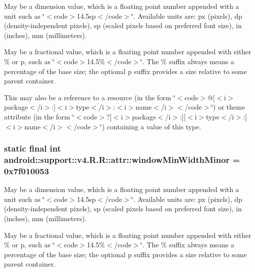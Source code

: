 May be a dimension value, which is a floating point number appended with a unit such as \char`\"{}$<$code$>$14.5sp$<$/code$>$\char`\"{}. Available units are: px (pixels), dp (density-independent pixels), sp (scaled pixels based on preferred font size), in (inches), mm (millimeters). 

May be a fractional value, which is a floating point number appended with either \% or p, such as \char`\"{}$<$code$>$14.5\%$<$/code$>$\char`\"{}. The \% suffix always means a percentage of the base size; the optional p suffix provides a size relative to some parent container. 

This may also be a reference to a resource (in the form \char`\"{}$<$code$>$@\mbox{[}$<$i$>$package$<$/i$>$:\mbox{]}$<$i$>$type$<$/i$>$:$<$i$>$name$<$/i$>$$<$/code$>$\char`\"{}) or theme attribute (in the form \char`\"{}$<$code$>$?\mbox{[}$<$i$>$package$<$/i$>$:\mbox{]}\mbox{[}$<$i$>$type$<$/i$>$:\mbox{]}$<$i$>$name$<$/i$>$$<$/code$>$\char`\"{}) containing a value of this type. \hypertarget{classandroid_1_1support_1_1v4_1_1_r_1_1attr_9fd4e34aa7a7b94a60e07ee5f9f4836a}{
\subsubsection[{windowMinWidthMinor}]{\setlength{\rightskip}{0pt plus 5cm}static final int android::support::v4.R.R::attr::windowMinWidthMinor = 0x7f010053}}
\label{classandroid_1_1support_1_1v4_1_1_r_1_1attr_9fd4e34aa7a7b94a60e07ee5f9f4836a}


May be a dimension value, which is a floating point number appended with a unit such as \char`\"{}$<$code$>$14.5sp$<$/code$>$\char`\"{}. Available units are: px (pixels), dp (density-independent pixels), sp (scaled pixels based on preferred font size), in (inches), mm (millimeters). 

May be a fractional value, which is a floating point number appended with either \% or p, such as \char`\"{}$<$code$>$14.5\%$<$/code$>$\char`\"{}. The \% suffix always means a percentage of the base size; the optional p suffix provides a size relative to some parent container. 

